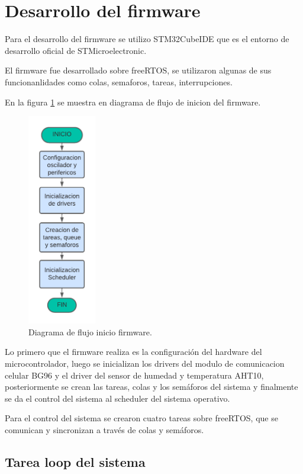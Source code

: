 \section{Desarrollo del firmware}

Para el desarrollo del firmware se utilizo STM32CubeIDE que es el entorno de desarrollo oficial de STMicroelectronic.

El firmware fue desarrollado sobre freeRTOS, se utilizaron algunas de sus funcionanlidades como colas, semaforos, tareas, interrupciones.

En la figura \ref{fig:Df inicio firmware}  se muestra en diagrama de flujo de inicion del firmware.

\begin{figure}[htbp]
  \centering
	\includegraphics[width=3cm]{./Figures/DF inicio firmware.png}
	\caption{Diagrama de flujo inicio firmware.}
	\label{fig:Df inicio firmware}
\end{figure}

Lo primero que el firmware realiza es la configuración del hardware del microcontrolador, luego se inicializan los drivers del modulo de comunicacion celular BG96 y el driver del sensor de humedad y temperatura AHT10, posteriormente se crean las tareas, colas y los semáforos del sistema y finalmente se da el control del sistema al scheduler del sistema operativo. 

Para el control del sistema se crearon cuatro tareas sobre freeRTOS, que se comunican y sincronizan a través de colas y semáforos.

\subsection{Tarea loop del sistema} 

